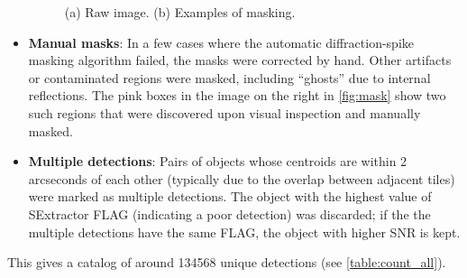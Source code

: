 \documentclass[a4paper,11pt]{article}
\begin{document}
\begin{itemize}
\begin{figure}[th]
  \centering
  \hfill
\caption{(a) Raw image. (b) Examples of masking.}
  \label{fig:mask}
\end{figure}
\item \textbf{Manual masks}: In a few cases where the automatic diffraction-spike masking algorithm failed, the masks were corrected by hand. Other artifacts or contaminated regions were masked, including ``ghosts'' due to internal reflections. The pink boxes in the image on the right in \autoref{fig:mask} show two such regions that were discovered upon visual inspection and manually masked.
\item \textbf{Multiple detections}: Pairs of objects whose centroids are within 2 arcseconds of each other (typically due to the overlap between adjacent tiles) were marked as multiple detections. 
The object with the highest value of SExtractor FLAG (indicating a poor detection) was discarded;
if the the multiple detections have the same FLAG, the object with  higher SNR is kept.
\end{itemize}
This gives a catalog of around \num{134568} unique detections (see \autoref{table:count_all}). 
\end{document}
